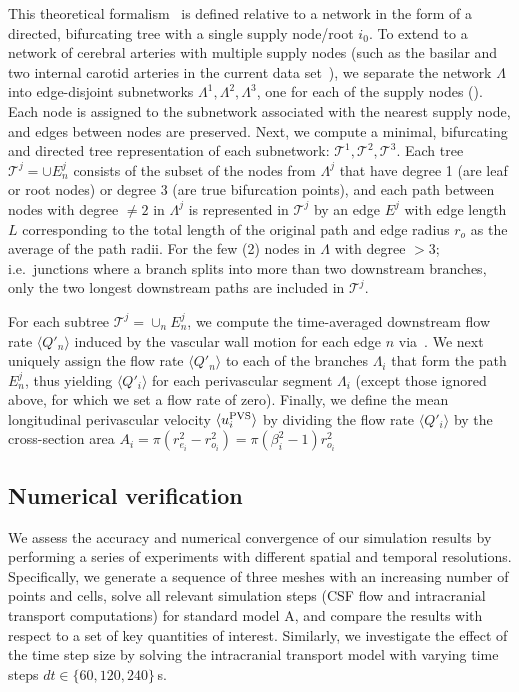 
This theoretical formalism~\cite{gjerde2023directional} is defined
relative to a network in the form of a directed, bifurcating tree with
a single supply node/root $i_0$. To extend to a network of cerebral
arteries with multiple supply nodes (such as the basilar and two
internal carotid arteries in the current data
set~\cite{hodneland2019new}), we separate the network $\Lambda$ into
edge-disjoint subnetworks $\Lambda^1, \Lambda^2, \Lambda^3$, one for
each of the supply nodes (). Each node is assigned to the subnetwork associated with the nearest supply node, and edges between nodes are preserved. Next, we compute a minimal, bifurcating and directed tree representation of each subnetwork: $\mathcal{T}^1, \mathcal{T}^2, \mathcal{T}^3$. Each tree $\mathcal{T}^j = \cup E_n^j$ consists of the subset of the nodes from $\Lambda^j$ that have degree 1 (are leaf or root nodes) or degree $3$ (are true bifurcation points), and each path between nodes with degree $\not = 2$ in $\Lambda^j$ is represented in $\mathcal{T}^j$ by an edge $E^j$ with edge length $L$ corresponding to the total length of the original path and edge radius $r_o$ as the average of the path radii. For the few (2) nodes in $\Lambda$ with degree $>3$; i.e.~junctions where a branch splits into more than two downstream branches, only the two longest downstream paths are included in $\mathcal{T}^j$.

For each subtree $\mathcal{T}^j = \cup_n E_n^j$, we compute the
time-averaged downstream flow rate $\langle Q'_n \rangle$ induced by
the vascular wall motion for each edge $n$ via~\cite[eq.~(5),
  (34)]{gjerde2023directional}. We next uniquely assign the flow rate
$\langle Q'_n \rangle$ to each of the branches $\Lambda_i$ that form
the path $E_n^j$, thus yielding $\langle Q'_i \rangle$ for each
perivascular segment $\Lambda_i$ (except those ignored above, for
which we set a flow rate of zero). Finally, we define the mean
longitudinal perivascular velocity $\langle u^{\rm PVS}_i \rangle$ by
dividing the flow rate $\langle Q'_i \rangle$ by the cross-section
area $A_i = \pi (r_{e_i}^2 - r_{o_i}^2) = \pi (\beta_i^2 - 1) r_{o_i}^2$

\subsection{Numerical verification}

We assess the accuracy and numerical convergence of our simulation results by performing a series of experiments with different spatial and temporal resolutions. Specifically, we generate a sequence of three meshes with an increasing number of points and cells, solve all relevant simulation steps (CSF flow and intracranial transport computations) for standard model A, and compare the results with respect to a set of key quantities of interest. Similarly, we investigate the effect of the time step size by solving the intracranial transport model with varying time steps $dt \in \{60, 120, 240 \}$\,s.

